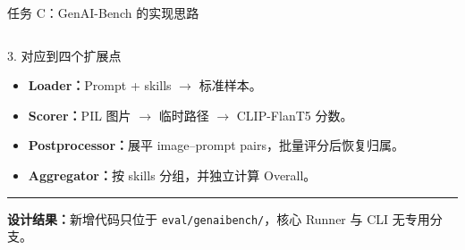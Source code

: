 \documentclass[aspectratio=169,10pt]{beamer}
\begin{document}
\begin{frame}{任务 C：GenAI-Bench 的实现思路}
\begin{columns}[T,onlytextwidth]
      \begin{block}{3. 对应到四个扩展点}
        \begin{minipage}[c][5.05cm][c]{\linewidth}
          \begin{itemize}\scriptsize
            \item \textbf{Loader：}Prompt + skills $\to$ 标准样本。
            \item \textbf{Scorer：}PIL 图片 $\to$ 临时路径 $\to$ CLIP-FlanT5 分数。
            \item \textbf{Postprocessor：}展平 image--prompt pairs，批量评分后恢复归属。
            \item \textbf{Aggregator：}按 skills 分组，并独立计算 Overall。
          \end{itemize}
          \vspace{0.45em}
          \color{T2IGray}\rule{\linewidth}{0.35pt}\par\vspace{0.3em}
          \scriptsize\textbf{设计结果：}新增代码只位于 \texttt{eval/genaibench/}，核心 Runner 与 CLI 无专用分支。
        \end{minipage}
      \end{block}
  \end{columns}
\end{frame}
\end{document}
